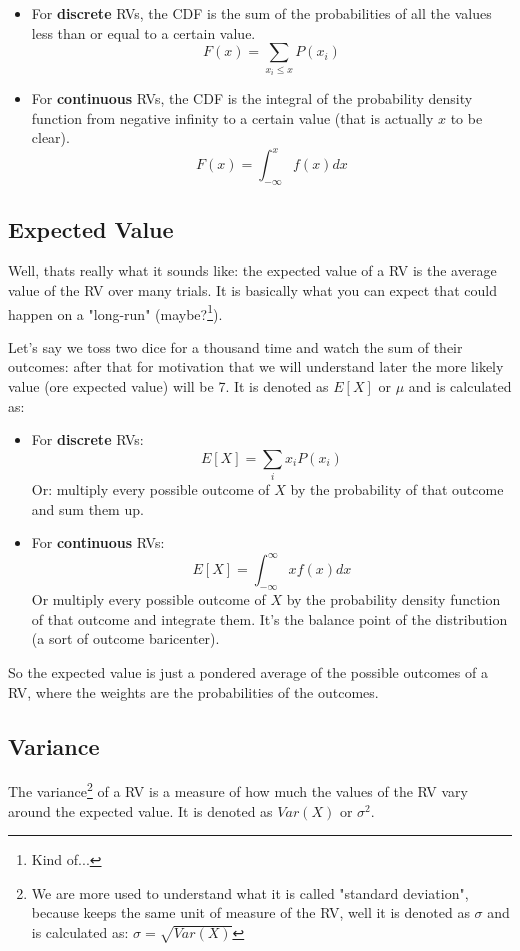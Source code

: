 \documentclass[a4paper]{article}
\begin{document}
\begin{itemize}
    \item For \textbf{discrete} RVs, the CDF is the sum of the probabilities of all the values less than or equal to a certain value.
    $$ F(x) = \sum_{x_i \leq x} P(x_i) $$
    \item For \textbf{continuous} RVs, the CDF is the integral of the probability density function from negative infinity to a certain value (that is actually $x$ to be clear).
    $$ F(x) = \int_{-\infty}^{x} f(x)dx $$
\end{itemize}

\subsection{Expected Value}
Well, thats really what it sounds like: the expected value of a RV is the average value of the RV over many trials. It is basically what you can expect that could happen on a "long-run" (maybe?\footnote{Kind of...}). 

Let's say we toss two dice for a thousand time and watch the sum of their outcomes: after that for motivation that we will understand later the more likely value (ore expected value) will be 7. It is denoted as \( E[X] \) or \( \mu \) and is calculated as:
\begin{itemize}
    \item For \textbf{discrete} RVs:
    $$ E[X] = \sum_{i} x_iP(x_i) $$
    Or: multiply every possible outcome of $X$ by the probability of that outcome and sum them up.
    \item For \textbf{continuous} RVs:
    $$ E[X] = \int_{-\infty}^{\infty} xf(x)dx $$
    Or multiply every possible outcome of $X$ by the probability density function of that outcome and integrate them. It's the balance point of the distribution (a sort of outcome baricenter).
\end{itemize}
So the expected value is just a pondered average of the possible outcomes of a RV, where the weights are the probabilities of the outcomes.

\subsection{Variance}
The variance\footnote{We are more used to understand what it is called "standard deviation", because keeps the same unit of measure of the RV, well it is denoted as \( \sigma \) and is calculated as: $ \sigma = \sqrt{Var(X)}$} of a RV is a measure of how much the values of the RV vary around the expected value. It is denoted as \( Var(X) \) or \( \sigma^2 \).
\end{document}
